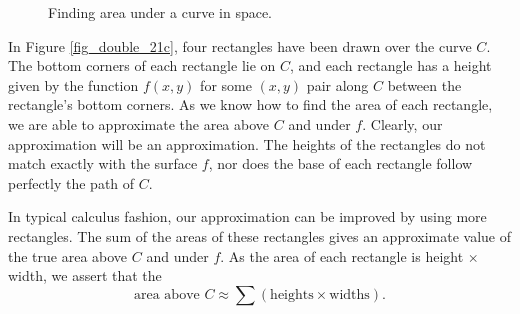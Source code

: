 \begin{figure}[t]
\centering
\qquad
{}
\qquad
{}
\caption{Finding area under a curve in space.}
\end{figure}


In Figure \ref{fig_double_21c}, four rectangles have been drawn over the curve $C$. The bottom corners of each rectangle lie on $C$, and each rectangle has a height given by the function $f(x,y)$ for some $(x,y)$ pair along $C$ between the rectangle's bottom corners. 
As we know how to find the area of each rectangle, we are able to approximate the area above $C$ and under $f$. Clearly, our approximation will be an approximation. The heights of the rectangles do not match exactly with the surface $f$, nor does the base of each rectangle follow perfectly the path of $C$.

In typical calculus fashion, our approximation can be improved by using more rectangles. The sum of the areas of these rectangles gives an approximate value of the true area above $C$ and under $f$. As the area of each rectangle is height $\times$ width, we assert that the
$$\text{area above $C$}\approx \sum (\text{heights}\times\text{widths}).$$

